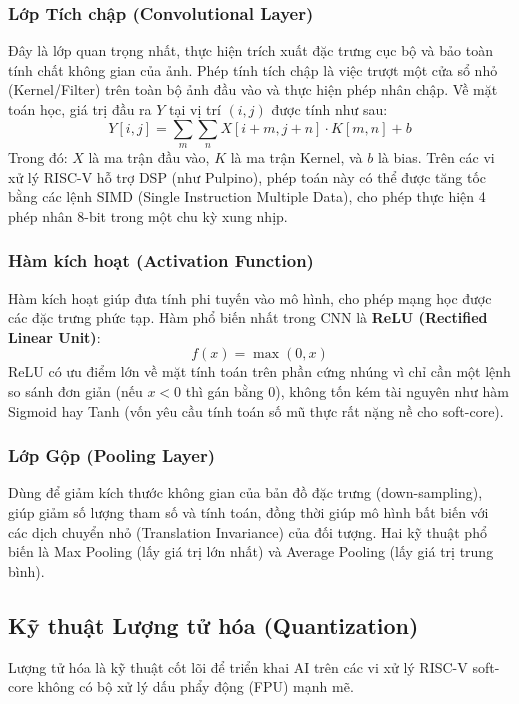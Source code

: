 \subsubsection{Lớp Tích chập (Convolutional Layer)}

Đây là lớp quan trọng nhất, thực hiện trích xuất đặc trưng cục bộ và bảo toàn tính chất không gian của ảnh. Phép tính tích chập là việc trượt một cửa sổ nhỏ (Kernel/Filter) trên toàn bộ ảnh đầu vào và thực hiện phép nhân chập.
Về mặt toán học, giá trị đầu ra $Y$ tại vị trí $(i, j)$ được tính như sau:
\begin{equation}
Y[i, j] = \sum_{m} \sum_{n} X[i+m, j+n] \cdot K[m, n] + b
\end{equation}
Trong đó: $X$ là ma trận đầu vào, $K$ là ma trận Kernel, và $b$ là bias. Trên các vi xử lý RISC-V hỗ trợ DSP (như Pulpino), phép toán này có thể được tăng tốc bằng các lệnh SIMD (Single Instruction Multiple Data), cho phép thực hiện 4 phép nhân 8-bit trong một chu kỳ xung nhịp.

\subsubsection{Hàm kích hoạt (Activation Function)}
Hàm kích hoạt giúp đưa tính phi tuyến vào mô hình, cho phép mạng học được các đặc trưng phức tạp. Hàm phổ biến nhất trong CNN là \textbf{ReLU (Rectified Linear Unit)}:
\begin{equation}
f(x) = \max(0, x)
\end{equation}
ReLU có ưu điểm lớn về mặt tính toán trên phần cứng nhúng vì chỉ cần một lệnh so sánh đơn giản (nếu $x < 0$ thì gán bằng 0), không tốn kém tài nguyên như hàm Sigmoid hay Tanh (vốn yêu cầu tính toán số mũ thực rất nặng nề cho soft-core).

\subsubsection{Lớp Gộp (Pooling Layer)}
Dùng để giảm kích thước không gian của bản đồ đặc trưng (down-sampling), giúp giảm số lượng tham số và tính toán, đồng thời giúp mô hình bất biến với các dịch chuyển nhỏ (Translation Invariance) của đối tượng. Hai kỹ thuật phổ biến là Max Pooling (lấy giá trị lớn nhất) và Average Pooling (lấy giá trị trung bình).

\subsection{Kỹ thuật Lượng tử hóa (Quantization)}
Lượng tử hóa là kỹ thuật cốt lõi để triển khai AI trên các vi xử lý RISC-V soft-core không có bộ xử lý dấu phẩy động (FPU) mạnh mẽ.

